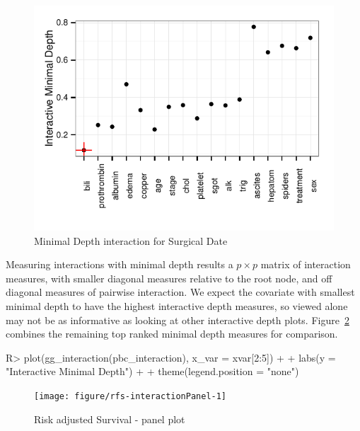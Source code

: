 \documentclass[nojss]{jss}\usepackage[]{graphicx}\usepackage[]{color}
\makeatletter
\def\maxwidth{ %
  \ifdim\Gin@nat@width>\linewidth
    \linewidth
  \else
    \Gin@nat@width
  \fi
}
\makeatother
\begin{document}
\begin{Schunk}
\begin{figure}[!htpb]

{\centering \includegraphics[width=\maxwidth]{figure/rfs-interaction-1} 

}

\caption[Minimal Depth interaction for Surgical Date]{Minimal Depth interaction for Surgical Date\label{fig:interaction}}
\end{figure}
\end{Schunk}

Measuring interactions with minimal depth results a $p \times p$ matrix of interaction measures, with smaller diagonal measures relative to the root node, and off diagonal measures of pairwise interaction. We expect the covariate with smallest minimal depth to have the highest interactive depth measures, so viewed alone may not be as informative as looking at other interactive depth plots. Figure~\ref{fig:interactionPanel} combines the remaining top ranked minimal depth measures for comparison.
\begin{Schunk}
\begin{Sinput}
R> plot(gg_interaction(pbc_interaction), x_var = xvar[2:5]) + 
+  labs(y = "Interactive Minimal Depth") + 
+  theme(legend.position = "none")
\end{Sinput}
\begin{figure}[!htpb]

{\centering \texttt{[image: figure/rfs-interactionPanel-1]} 

}

\caption[Risk adjusted Survival - panel plot]{Risk adjusted Survival - panel plot\label{fig:interactionPanel}}
\end{figure}
\end{Schunk}
\end{document}
